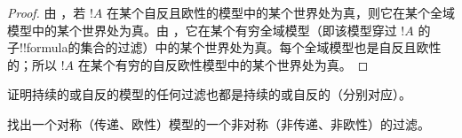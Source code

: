 \documentclass[../../../include/open-logic-section]{subfiles}
\begin{document}
\begin{proof}
  由 ，若 $!A$ 在某个自反且欧性的模型中的某个世界处为真，则它在某个全域模型中的某个世界处为真。由 ，它在某个有穷全域模型（即该模型穿过 $!A$ 的子!!{formula}的集合的过滤）中的某个世界处为真。每个全域模型也是自反且欧性的；所以 $!A$ 在某个有穷的自反欧性模型中的某个世界处为真。
\end{proof}

\begin{prob}
  证明持续的或自反的模型的任何过滤也都是持续的或自反的（分别对应）。
\end{prob}

\begin{prob}
  找出一个对称（传递、欧性）模型的一个非对称（非传递、非欧性）的过滤。
\end{prob}
\end{document}
